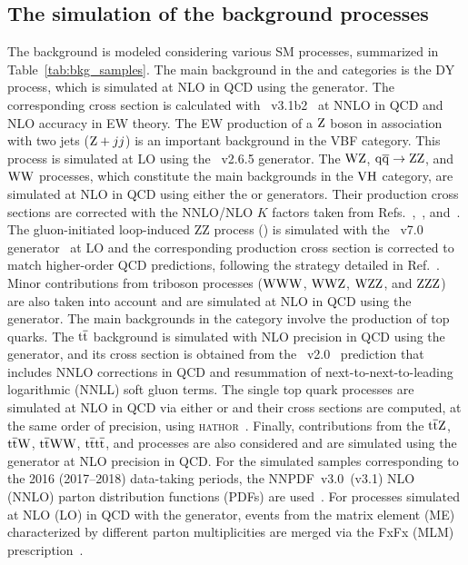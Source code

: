 \bigskip
\subsection{The simulation of the background processes}
The background is modeled considering various SM processes, summarized in Table~\ref{tab:bkg_samples}.
The main background in the \ggH and \qqH categories is the DY process, which is simulated at NLO in QCD using the \MGvATNLO generator. 
The corresponding cross section is calculated with \FEWZ~v3.1b2~\cite{Li:2012wna} at NNLO in QCD and NLO accuracy in EW theory. 
The EW production of a $\mathrm{Z}$ boson in association with two jets ($\mathrm{Z}+jj$) is an important background in the VBF category. 
This process is simulated at LO using the \MGvATNLO~v2.6.5 generator. 
The $\mathrm{W}\mathrm{Z}$, ${\mathrm{q}\overline{\mathrm{q}}\to\mathrm{Z}\mathrm{Z}}$, and $\mathrm{W}\mathrm{W}$ processes, which constitute the main backgrounds in the $\mathrm{V}\mathrm{H}$ category, 
are simulated at NLO in QCD using either the \POWHEG or \MGvATNLO generators. 
Their production cross sections are corrected with the NNLO/NLO $K$ factors taken from Refs.~\cite{Grazzini:2017ckn},~\cite{Grazzini:2015hta}, and~\cite{Gehrmann:2014fva}. 
The gluon-initiated loop-induced ZZ process (\ggZZ) is simulated with the \MCFM~v7.0 generator~\cite{Campbell:2011bn} at LO 
and the corresponding production cross section is corrected to match higher-order QCD predictions, following the strategy detailed in Ref.~\cite{Sirunyan:2017exp}. 
Minor contributions from triboson processes ($\mathrm{W}\mathrm{W}\mathrm{W}$, $\mathrm{W}\mathrm{W}\mathrm{Z}$, $\mathrm{W}\mathrm{Z}\mathrm{Z}$, and $\mathrm{Z}\mathrm{Z}\mathrm{Z}$) are also taken into account and are simulated at NLO in QCD using the \MGvATNLO generator. 
The main backgrounds in the \ttH category involve the production of top quarks. 
The $\mathrm{t}\overline{\mathrm{t}}$ background is simulated with NLO precision in QCD using the \POWHEG generator, and its cross section is obtained from the \TOPpp~v2.0~\cite{Czakon:2011xx} prediction 
that includes NNLO corrections in QCD and resummation of next-to-next-to-leading logarithmic (NNLL) soft gluon terms. 
The single top quark processes are simulated at NLO in QCD via either \POWHEG or \MGvATNLO and their cross sections are computed, 
at the same order of precision, using \textsc{hathor}~\cite{Kant:2014oha}. 
Finally, contributions from the $\mathrm{t}\overline{\mathrm{t}}\mathrm{Z}$, $\mathrm{t}\overline{\mathrm{t}}\mathrm{W}$, $\mathrm{t}\overline{\mathrm{t}}\mathrm{W}\mathrm{W}$, ${\mathrm{t}\overline{\mathrm{t}}\mathrm{t}\overline{\mathrm{t}}}$, and \tZq processes 
are also considered and are simulated using the \MGvATNLO generator at NLO precision in QCD. 
For the simulated samples corresponding to the 2016 (2017--2018) data-taking periods, the NNPDF~v3.0~(v3.1) NLO (NNLO) parton distribution functions (PDFs) are used~\cite{Ball:2014uwa,Ball:2017nwa}. 
For processes simulated at NLO (LO) in QCD with the \MGvATNLO generator, events from the matrix element (ME) characterized by different parton multiplicities are merged via the FxFx (MLM) prescription~\cite{Alwall:2007fs,Frederix:2012ps}.



